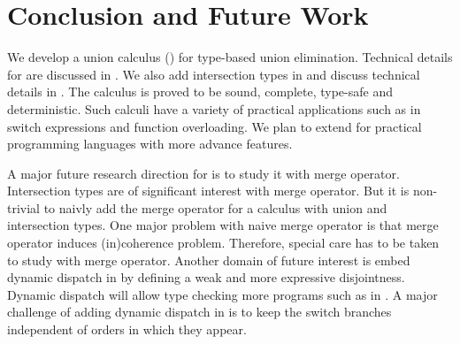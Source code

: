 \section{Conclusion and Future Work}
\label{sec:conclusion}

We develop a union calculus (\cal) for type-based union elimination.
Technical details for \cal are discussed in .
We also add intersection types in \cal and discuss technical details in .
The calculus is proved to be sound, complete, type-safe and deterministic.
Such calculi have a variety of practical applications such as in switch expressions
and function overloading. We plan to extend \cal for practical programming languages
with more advance features.

A major future research direction for \cal is to study it with merge operator.
Intersection types are of significant interest with merge operator. But it is non-trivial
to naivly add the merge operator for a calculus with union and intersection types.
One major problem with naive merge operator is that merge operator induces (in)coherence problem.
Therefore, special care has to be taken to study \cal with merge operator.
Another domain of future interest is embed dynamic dispatch in \cal by defining a weak
and more expressive disjointness. Dynamic dispatch will allow type checking more programs
such as in . A major challenge of adding dynamic dispatch in
\cal is to keep the switch branches independent of orders in which they appear.